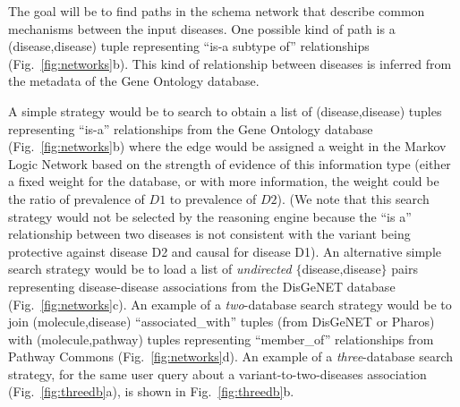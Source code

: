 \documentclass[11pt,notitlepage]{article}
\begin{document}
The goal will be to find paths in the schema network that describe common mechanisms between the input diseases. One possible kind of path is a (disease,disease) tuple representing ``is-a subtype of'' relationships (Fig.~\ref{fig:networks}b). This kind of relationship between diseases is inferred from the metadata of the Gene Ontology database. 

A simple strategy would be to search to obtain a list of (disease,disease)
tuples representing ``is-a'' relationships from the Gene Ontology database
(Fig.~\ref{fig:networks}b) where the edge would be assigned a weight in the
Markov Logic Network based on the strength of evidence of this information type
(either a fixed weight for the database, or with more information, the weight
could be the ratio of prevalence of $D1$ to prevalence of $D2$). (We note that
this search strategy would not be selected by the reasoning engine because the
``is a'' relationship between two diseases is not consistent with the variant
being protective against disease D2 and causal for disease D1). An alternative
simple search strategy would be to load a list of {\em undirected\/}
$\{$disease,disease$\}$ pairs representing disease-disease associations from the
DisGeNET database (Fig.~\ref{fig:networks}c). An example of a {\em two}-database
search strategy would be to join (molecule,disease) ``associated\_with'' tuples
(from DisGeNET or Pharos) with (molecule,pathway) tuples representing
``member\_of'' relationships from Pathway Commons (Fig.~\ref{fig:networks}d). An
example of a {\em three}-database search strategy, for the same user query about
a variant-to-two-diseases association (Fig.~\ref{fig:threedb}a), is shown in
Fig.~\ref{fig:threedb}b.
\end{document}
